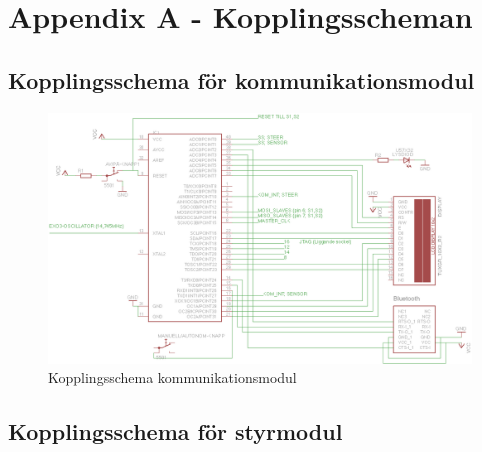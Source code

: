\documentclass[a4paper,12pt,fleqn]{article}
\begin{document}

\newpage
\appendix
\pagestyle{empty}
\section{Appendix A - Kopplingsscheman}
\subsection{Kopplingsschema för kommunikationsmodul}

\begin{figure}[ht] %
  \begin{center}
  \includegraphics[keepaspectratio=true,width=\linewidth]{bilder/kom_uptodate.png}  %
  \end{center}
  \caption{Kopplingsschema kommunikationsmodul} %
  \label{fig:kopplingkom} %
\end{figure}
 \clearpage %
 

\subsection{Kopplingsschema för styrmodul}
\end{document}
